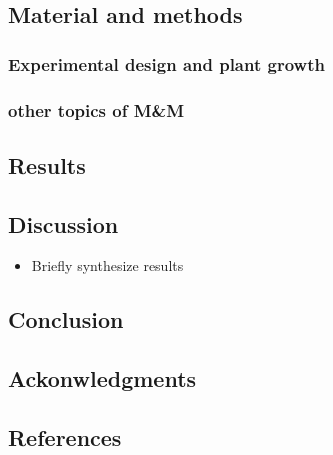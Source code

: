 \documentclass[
  12pt,
  letterpaper,
  DIV=11,
  numbers=noendperiod]{scrartcl}
\providecommand{\tightlist}{%
  \setlength{\itemsep}{0pt}\setlength{\parskip}{0pt}}\usepackage{longtable,booktabs,array}
\begin{document}
\hypertarget{material-and-methods}{%
\subsection{Material and methods}\label{material-and-methods}}

\hypertarget{experimental-design-and-plant-growth}{%
\subsubsection{Experimental design and plant
growth}\label{experimental-design-and-plant-growth}}

\hypertarget{other-topics-of-mm}{%
\subsubsection{other topics of M\&M}\label{other-topics-of-mm}}

\hypertarget{results}{%
\subsection{Results}\label{results}}

\hypertarget{discussion}{%
\subsection{Discussion}\label{discussion}}

\begin{itemize}
\tightlist
\item
  Briefly synthesize results
\end{itemize}

\hypertarget{conclusion}{%
\subsection{Conclusion}\label{conclusion}}

\hypertarget{ackonwledgments}{%
\subsection{Ackonwledgments}\label{ackonwledgments}}

\clearpage

\hypertarget{references}{%
\subsection{References}\label{references}}
\end{document}
